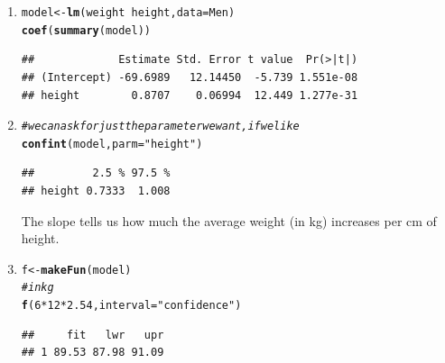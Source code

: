 \documentclass[twoside]{book}\usepackage[]{graphicx}\usepackage[]{xcolor}
\makeatletter
\newcommand{\hlnum}[1]{\textcolor[rgb]{0.686,0.059,0.569}{#1}}%
\newcommand{\hlstr}[1]{\textcolor[rgb]{0.192,0.494,0.8}{#1}}%
\newcommand{\hlcom}[1]{\textcolor[rgb]{0.678,0.584,0.686}{\textit{#1}}}%
\newcommand{\hlopt}[1]{\textcolor[rgb]{0,0,0}{#1}}%
\newcommand{\hlstd}[1]{\textcolor[rgb]{0.345,0.345,0.345}{#1}}%
\newcommand{\hlkwb}[1]{\textcolor[rgb]{0.69,0.353,0.396}{#1}}%
\newcommand{\hlkwc}[1]{\textcolor[rgb]{0.333,0.667,0.333}{#1}}%
\newcommand{\hlkwd}[1]{\textcolor[rgb]{0.737,0.353,0.396}{\textbf{#1}}}%
\newenvironment{kframe}{%
 \def\at@end@of@kframe{}%
 \ifinner\ifhmode%
  \def\at@end@of@kframe{\end{minipage}}%
  \begin{minipage}{\columnwidth}%
 \fi\fi%
 \def\FrameCommand##1{\hskip\@totalleftmargin \hskip-\fboxsep
 \colorbox{shadecolor}{##1}\hskip-\fboxsep
     \hskip-\linewidth \hskip-\@totalleftmargin \hskip\columnwidth}%
 \MakeFramed {\advance\hsize-\width
   \@totalleftmargin\z@ \linewidth\hsize
   \@setminipage}}%
 {\par\unskip\endMakeFramed%
 \at@end@of@kframe}
\newenvironment{knitrout}{}{} %
\newcommand{\variable}[1]{{\color{green!50!black}\texttt{#1}}}
\makeatother
\begin{document}
\begin{solution}
	\begin{enumerate}
		\item
\begin{knitrout}
\color{fgcolor}\begin{kframe}
\begin{alltt}
\hlstd{model} \hlkwb{<-} \hlkwd{lm}\hlstd{( weight} \hlopt{~} \hlstd{height,} \hlkwc{data} \hlstd{= Men )}
\hlkwd{coef}\hlstd{(}\hlkwd{summary}\hlstd{(model))}
\end{alltt}
\begin{verbatim}
##             Estimate Std. Error t value  Pr(>|t|)
## (Intercept) -69.6989   12.14450  -5.739 1.551e-08
## height        0.8707    0.06994  12.449 1.277e-31
\end{verbatim}
\end{kframe}
\end{knitrout}
		\item
\begin{knitrout}
\color{fgcolor}\begin{kframe}
\begin{alltt}
\hlcom{# we can ask for just the parameter we want, if we like}
\hlkwd{confint}\hlstd{(model,} \hlkwc{parm} \hlstd{=} \hlstr{"height"}\hlstd{)}
\end{alltt}
\begin{verbatim}
##         2.5 % 97.5 %
## height 0.7333  1.008
\end{verbatim}
\end{kframe}
\end{knitrout}
The slope tells us how much the average weight (in kg) increases per 
cm of height.
		\item
\begin{knitrout}
\color{fgcolor}\begin{kframe}
\begin{alltt}
\hlstd{f} \hlkwb{<-} \hlkwd{makeFun}\hlstd{(model)}
\hlcom{# in kg}
\hlkwd{f}\hlstd{(}\hlnum{6} \hlopt{*} \hlnum{12} \hlopt{*} \hlnum{2.54}\hlstd{,} \hlkwc{interval} \hlstd{=} \hlstr{"confidence"}\hlstd{)}
\end{alltt}
\begin{verbatim}
##     fit   lwr   upr
## 1 89.53 87.98 91.09

\end{verbatim}
\end{kframe}
\end{knitrout}
\end{enumerate}
\end{solution}
\end{document}
